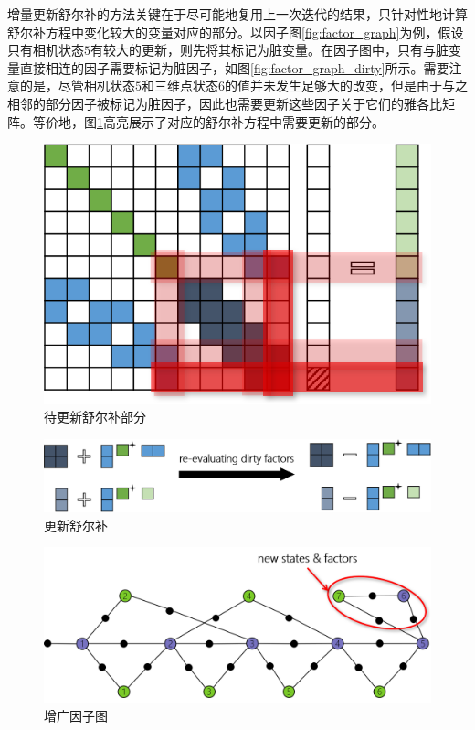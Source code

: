 增量更新舒尔补的方法关键在于尽可能地复用上一次迭代的结果，只针对性地计算舒尔补方程中变化较大的变量对应的部分。以因子图\ref{fig:factor_graph}为例，假设只有相机状态$5$有较大的更新，则先将其标记为脏变量。在因子图中，只有与脏变量直接相连的因子需要标记为脏因子，如图\ref{fig:factor_graph_dirty}所示。需要注意的是，尽管相机状态$5$和三维点状态$6$的值并未发生足够大的改变，但是由于与之相邻的部分因子被标记为脏因子，因此也需要更新这些因子关于它们的雅各比矩阵。等价地，图\ref{fig:normal_eq_dirty}高亮展示了对应的舒尔补方程中需要更新的部分。

\begin{figure}[htb!]
    \centering
    \includegraphics{figs/normal_eq_cursed.png}
    \caption{待更新舒尔补部分}
    \label{fig:normal_eq_dirty}
\end{figure}

\begin{figure}[htb!]
    \centering
    \includegraphics[width=\textwidth]{figs/schur_update.png}
    \caption{更新舒尔补}
\end{figure}

\begin{figure}[htb!]
    \centering
    \includegraphics[width=.8\textwidth]{figs/factor_graph_aug.png}
    \caption{增广因子图}
\end{figure}

